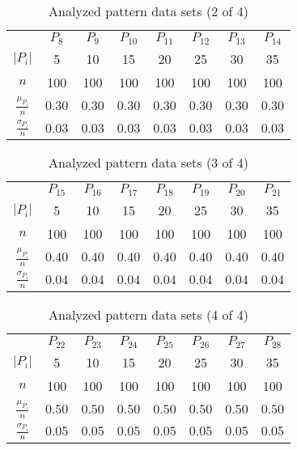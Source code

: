 \documentclass[anon]{CI}
\begin{document}
\begin{table}[H]
	\centering
	\def\arraystretch{1.5}
	\begin{tabular}{cccccccc}
		
		& $P_{8}$  & $P_{9}$  & $P_{10}$  & $P_{11}$  & $P_{12}$  & $P_{13}$  & $P_{14}$  \\ \cline{2-8}
		$\left|P_i\right|$  & 5  & 10  & 15  & 20  & 25  & 30  & 35 \\
		$n$  & 100  & 100  & 100  & 100  & 100  & 100  & 100 \\
		$\frac{\mu_{P_i}}{n}$  & $0.30$  & $0.30$  & $0.30$  & $0.30$  & $0.30$  & $0.30$  & $0.30$ \\
		$\frac{\sigma_{P_i}}{n}$  & $0.03$  & $0.03$  & $0.03$  & $0.03$  & $0.03$  & $0.03$  & $0.03$ 
	\end{tabular}
	\caption{Analyzed pattern data sets (2 of 4)}
\end{table}


\begin{table}[H]
	\centering
	\def\arraystretch{1.5}
	\begin{tabular}{cccccccc}
		
		& $P_{15}$  & $P_{16}$  & $P_{17}$  & $P_{18}$  & $P_{19}$  & $P_{20}$  & $P_{21}$  \\ \cline{2-8}
		$\left|P_i\right|$  & 5  & 10  & 15  & 20  & 25  & 30  & 35 \\
		$n$  & 100  & 100  & 100  & 100  & 100  & 100  & 100 \\
		$\frac{\mu_{P_i}}{n}$  & $0.40$  & $0.40$  & $0.40$  & $0.40$  & $0.40$  & $0.40$  & $0.40$ \\
		$\frac{\sigma_{P_i}}{n}$  & $0.04$  & $0.04$  & $0.04$  & $0.04$  & $0.04$  & $0.04$  & $0.04$ 
	\end{tabular}
	\caption{Analyzed pattern data sets (3 of 4)}
\end{table}


\begin{table}[H]
	\centering
	\def\arraystretch{1.5}
	\begin{tabular}{cccccccc}
		
		& $P_{22}$  & $P_{23}$  & $P_{24}$  & $P_{25}$  & $P_{26}$  & $P_{27}$  & $P_{28}$  \\ \cline{2-8}
		$\left|P_i\right|$  & 5  & 10  & 15  & 20  & 25  & 30  & 35 \\
		$n$  & 100  & 100  & 100  & 100  & 100  & 100  & 100 \\
		$\frac{\mu_{P_i}}{n}$  & $0.50$  & $0.50$  & $0.50$  & $0.50$  & $0.50$  & $0.50$  & $0.50$ \\
		$\frac{\sigma_{P_i}}{n}$  & $0.05$  & $0.05$  & $0.05$  & $0.05$  & $0.05$  & $0.05$  & $0.05$ 
	\end{tabular}
	\caption{Analyzed pattern data sets (4 of 4)}
\end{table}
\end{document}
